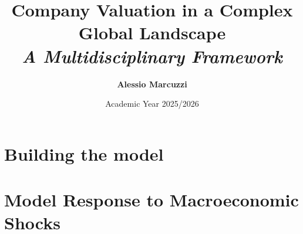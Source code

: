 \documentclass[12pt]{bookest}
\title{
    \vspace{2cm}
    \Huge \textbf{Company Valuation in a Complex Global Landscape} \\
    \vspace{0.5cm}
    \Large \textit{A Multidisciplinary Framework}
    \vspace{2cm}
}
\author{\Large \textbf{Alessio Marcuzzi}}
\date{\vfill \Large Academic Year 2025/2026}
\begin{document}
\maketitle
\cleardoublepage

\tableofcontents
\cleardoublepage

\setcounter{page}{7}



\part{Building the model}




\part{Model Response to Macroeconomic Shocks}







\newpage
{}
\printbibliography[heading=bibintoc, title={References}]
\end{document}
